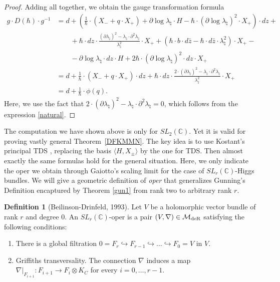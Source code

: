 \documentclass[oneside, 11pt]{amsart}
\theoremstyle{definition}
\newtheorem{Def}[thm]{Definition}
\numberwithin{equation}{subsection}
\def\lam{\lambda}
\def\deR{{\text{\rm{deR}}}}
\newcommand{\bC}{{\mathbb{C}}}
\newcommand{\cM}{{\mathcal{M}}}
\newcommand{\la}{{\langle}}
\newcommand{\ra}{{\rangle}}
\begin{document}
{\begin{proof}
Adding all together, we obtain the gauge 
transformation formula
\begin{align*}
g \cdot D(\hbar)\cdot g^{-1} &=
d + \left(\frac{1}{\hbar} \cdot (X_-+q \cdot X_+)
 +\partial \log\lam_\natural \cdot H -\hbar  \cdot
 (\partial\log\lam_\natural)^2 \cdot X_+
\right) \cdot dz+
\\
&\qquad
+ \hbar \cdot dz \cdot \frac{(\partial \lam_\natural)^2 -
\lam_\natural \cdot \partial^2\lam_\natural}{\lam_\natural^2} \cdot X_+
+ (\hbar \cdot b \cdot d\bar{z}-\hbar \cdot d\bar{z} \cdot \lam_\natural^2) \cdot
 X_+ -\\
&\qquad
-\partial \log \lam_\natural \cdot dz \cdot H +
2 \hbar \cdot (\partial \log\lam_\natural)^2\cdot dz \cdot X_+
\\
&=
d + \frac{1}{\hbar} \cdot (X_-+q \cdot X_+)\cdot dz 
+\hbar \cdot dz \cdot \frac{2 \cdot(\partial \lam_\natural)^2 -
\lam_\natural \cdot \partial^2\lam_\natural}{\lam_\natural^2} \cdot X_+
\\
&=
d+\frac{1}{\hbar}\cdot \phi(q).
\end{align*}
Here, we use the fact that
$2 \cdot (\partial \lam_\natural)^2 -
\lam_\natural \cdot \partial^2\lam_\natural=0$, which 
follows from the expression \eqref{natural}.
\end{proof}


The computation we have shown above 
is only for $SL_2(\bC)$. Yet it is valid for
proving vastly general Theorem~\ref{DFKMMN}. 
The key idea is to use Kostant's principal TDS
\cite{Kostant}, replacing the basis 
$\la H,X_\pm\ra$ by the one for TDS.
Then almost  exactly the  same formulas hold for the
general situation. Here, we only
indicate the oper we obtain 
through Gaiotto's scaling limit for the case of
$SL_r(\bC)$-Higgs bundles. We will give a geometric definition of \textit{oper} that generalizes Gunning's Definition encaptured by Theorem \ref{gun1} from rank two to arbitrary rank $r$.

\begin{Def}[Beilinson-Drinfeld, 1993]
\label{SLr oper}
 Let $V$ be a holomorphic vector bundle of rank $r$
and degree $0$. An $SL_r(\mathbb{C})$-oper is a pair $(V, \nabla)\in \cM_{\deR}$ satisfying the 
following conditions:
\begin{enumerate}
\item There is a global filtration
$0=F_{r}\hookrightarrow F_{r-1}\hookrightarrow \ldots \hookrightarrow F_{0}=V$ in $V$.

\item Griffiths transversality.
The connection $\nabla$ induces a map
$\nabla|_{F_{i+1}}:F_{i+1}\rightarrow F_{i}\otimes K_{C}$  for every $i=0, \dots,r-1$.


\end{enumerate}
\end{Def}}
\end{document}
